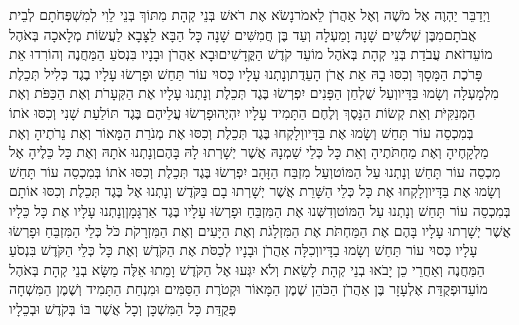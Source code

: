 \documentclass[../main/main.tex]{subfiles}
\begin{document}
\begin{multicols*}{\ncols}
וַיְדַבֵּר יַהְוֶה אֶל מֹשֶׁה וְאֶל אַהֲרֹן לֵאמֹר\PreVerseSpace{}נָשֹׂא אֶת רֹאשׁ בְּנֵי קְהָת מִתּוֹךְ בְּנֵי לֵוִי לְמִשְׁפְּחֹתָם לְבֵית אֲבֹתָם\PreVerseSpace{}מִבֶּן שְׁלֹשִׁים שָׁנָה וָמַעְלָה וְעַד בֶּן חֲמִשִּׁים שָׁנָה כָּל הַבָּא\SubEnd{} לַצָּבָא לַעֲשׂוֹת מְלָאכָה בְּאֹהֶל מוֹעֵד\PreVerseSpace{}זֹאת עֲבֹדַת בְּנֵי קְהָת בְּאֹהֶל מוֹעֵד קֹדֶשׁ הַקֳּדָשִׁים\PreVerseSpace{}וּבָא אַהֲרֹן וּבָנָיו בִּנְסֹעַ הַמַּחֲנֶה וְהוֹרִדוּ אֵת פָּרֹכֶת הַמָּסָךְ וְכִסּוּ בָהּ אֵת אֲרֹן הָעֵדֻת\PreVerseSpace{}וְנָתְנוּ עָלָיו כְּסוּי עוֹר תַּחַשׁ וּפָרְשׂוּ עָלָיו\OmitEnd{} בֶגֶד כְּלִיל תְּכֵלֶת מִלְמָעְלָה וְשָׂמוּ בַּדָּיו\PreVerseSpace{}וְעַל שֻׁלְחַן הַפָּנִים יִפְרְשׂוּ בֶּגֶד תְּכֵלֶת וְנָתְנוּ עָלָיו אֶת הַקְּעָרֹת וְאֶת הַכַּפֹּת וְאֶת הַמְּנַקִּיֹּת וְאֵת קְשׂוֹת הַנָּסֶךְ וְלֶחֶם הַתָּמִיד עָלָיו יִהְיֶה\PreVerseSpace{}וּפָרְשׂוּ עֲלֵיהֶם בֶּגֶד תּוֹלַעַת שָׁנִי וְכִסּוּ אֹתוֹ בְּמִכְסֵה עוֹר תָּחַשׁ וְשָׂמוּ אֶת בַּדָּיו\PreVerseSpace{}וְלָקְחוּ בֶּגֶד תְּכֵלֶת וְכִסּוּ אֶת מְנֹרַת הַמָּאוֹר וְאֶת נֵרֹתֶיהָ וְאֶת מַלְקָחֶיהָ וְאֶת מַחְתֹּתֶיהָ וְאֵת כָּל כְּלֵי שַׁמְנָהּ אֲשֶׁר יְשָׁרְתוּ לָהּ בָּהֶם\PreVerseSpace{}וְנָתְנוּ אֹתָהּ וְאֶת כָּל כֵּלֶיהָ אֶל מִכְסֵה עוֹר תָּחַשׁ וְנָתְנוּ עַל הַמּוֹט\PreVerseSpace{}וְעַל מִזְבַּח הַזָּהָב יִפְרְשׂוּ בֶּגֶד תְּכֵלֶת וְכִסּוּ אֹתוֹ בְּמִכְסֵה עוֹר תָּחַשׁ וְשָׂמוּ אֶת בַּדָּיו\PreVerseSpace{}וְלָקְחוּ אֶת כָּל כְּלֵי הַשָּׁרֵת אֲשֶׁר יְשָׁרְתוּ בָם בַּקֹּדֶשׁ וְנָתְנוּ אֶל בֶּגֶד תְּכֵלֶת וְכִסּוּ אוֹתָם בְּמִכְסֵה עוֹר תָּחַשׁ וְנָתְנוּ עַל הַמּוֹט\PreVerseSpace{}וְדִשְּׁנוּ אֶת הַמִּזְבֵּחַ וּפָרְשׂוּ עָלָיו בֶּגֶד אַרְגָּמָן\PreVerseSpace{}וְנָתְנוּ עָלָיו אֶת כָּל כֵּלָיו אֲשֶׁר יְשָׁרְתוּ עָלָיו בָּהֶם אֶת הַמַּחְתֹּת אֶת הַמִּזְלָגֹת וְאֶת הַיָּעִים וְאֶת הַמִּזְרָקֹת כֹּל כְּלֵי הַמִּזְבֵּחַ וּפָרְשׂוּ עָלָיו כְּסוּי עוֹר תַּחַשׁ וְשָׂמוּ בַדָּיו\PreVerseSpace{}וְכִלָּה אַהֲרֹן וּבָנָיו לְכַסֹּת אֶת הַקֹּדֶשׁ וְאֶת כָּל כְּלֵי הַקֹּדֶשׁ בִּנְסֹעַ הַמַּחֲנֶה וְאַחֲרֵי כֵן יָבֹאוּ בְנֵי קְהָת לָשֵׂאת וְלֹא יִגְּעוּ אֶל הַקֹּדֶשׁ וָמֵתוּ אֵלֶּה מַשָּׂא בְנֵי קְהָת בְּאֹהֶל מוֹעֵד\PreVerseSpace{}וּפְקֻדַּת אֶלְעָזָר בֶּן אַהֲרֹן הַכֹּהֵן שֶׁמֶן הַמָּאוֹר וּקְטֹרֶת הַסַּמִּים וּמִנְחַת הַתָּמִיד וְשֶׁמֶן הַמִּשְׁחָה פְּקֻדַּת כָּל הַמִּשְׁכָּן וְכָל אֲשֶׁר בּוֹ בְּקֹדֶשׁ וּבְכֵלָיו\OpenSection{}\par

\end{multicols*}
\end{document}
